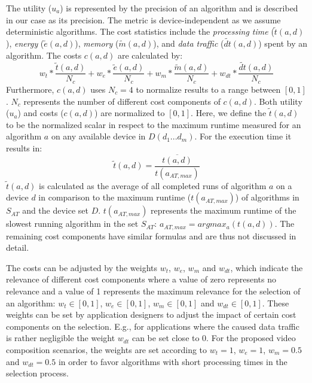 The utility ($u_{a}$) is represented by the precision of an algorithm and is described in our case as its precision.
The metric is device-independent as we assume deterministic algorithms. 
The cost statistics include the \textit{processing time} ($\tilde{t}(a, d)$), \textit{energy} ($\tilde{e}(a, d)$), \textit{memory} ($\tilde{m}(a, d)$), and \textit{data traffic} ($\tilde{dt}(a, d)$) spent by an algorithm.
The costs $c(a, d)$ are calculated by:
\begin{equation}				 
w_t * \frac{\tilde{t}(a, d)}{N_c} + w_e * \frac{\tilde{e}(a, d)}{N_c} + w_m * \frac{\tilde{m}(a, d)}{N_c} + w_{dt} * \frac{\tilde{dt}(a, d)}{N_c}
\end{equation}
Furthermore, $c(a, d)$ uses $N_c = 4$ to normalize results to a range between $[0,1]$.
$N_c$ represents the number of different cost components of $c(a, d)$.
Both utility ($u_{a}$) and costs ($c(a, d)$) are normalized to $[0,1]$.
Here, we define the $\tilde{t}(a, d)$ to be the normalized scalar in respect to the maximum runtime measured for an algorithm $a$ on any available device in $D(d_{1}...d_{m})$.
For the execution time it results in:
\begin{equation}
\tilde{t}(a, d) = \frac{\overline{t(a, d)}}{t(a_{AT,max})} 
\end{equation}
$\tilde{t}(a, d)$ is calculated as the average of all completed runs of algorithm $a$ on a device $d$ in comparison to the maximum runtime ($t(a_{AT,max})$) of algorithms in $S_{AT}$ and the device set $D$.
$t(a_{AT,max})$ represents the maximum runtime of the slowest running algorithm in the set $S_{AT}$: $a_{AT,max} = argmax_{a}(t(a, d))$. 
The remaining cost components have similar formulas and are thus not discussed in detail.

The costs can be adjusted by the weights $w_t$, $w_e$, $w_m$ and $w_{dt}$, which indicate the relevance of different cost components where a value of zero represents no relevance and a value of 1 represents the maximum relevance for the selection of an algorithm: $w_t \in [0,1]$, $w_e \in [0,1]$, $w_m \in [0,1]$ and $w_{dt} \in [0,1]$.
These weights can be set by application designers to adjust the impact of certain cost components on the selection.
E.g., for applications where the caused data traffic is rather negligible the weight $w_{dt}$ can be set close to 0. 
For the proposed video composition scenarios, the weights are set according to $w_t = 1$, $w_e = 1$, $w_m = 0.5$ and $w_{dt} = 0.5$ in order to favor algorithms with short processing times in the selection process.
